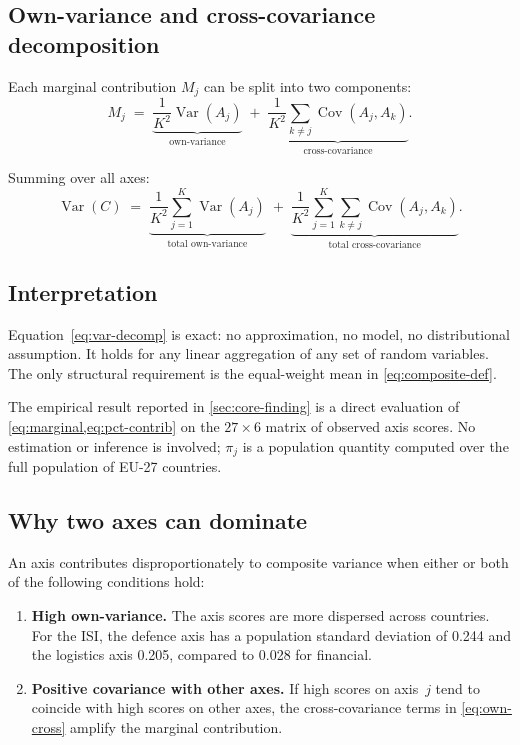 \subsection{Own-variance and cross-covariance decomposition}

Each marginal contribution $M_j$ can be split into two components:
\begin{equation}\label{eq:own-cross}
  M_j
  \;=\;
  \underbrace{\frac{1}{K^2}\operatorname{Var}(A_j)}_{\text{own-variance}}
  \;+\;
  \underbrace{\frac{1}{K^2}\sum_{k \neq j}
    \operatorname{Cov}(A_j, A_k)}_{\text{cross-covariance}}.
\end{equation}

Summing over all axes:
\begin{equation}\label{eq:own-cross-total}
  \operatorname{Var}(C)
  \;=\;
  \underbrace{\frac{1}{K^2}\sum_{j=1}^{K}
    \operatorname{Var}(A_j)}_{\text{total own-variance}}
  \;+\;
  \underbrace{\frac{1}{K^2}\sum_{j=1}^{K}\sum_{k \neq j}
    \operatorname{Cov}(A_j, A_k)}_{\text{total cross-covariance}}.
\end{equation}

\subsection{Interpretation}

Equation~\eqref{eq:var-decomp} is exact: no approximation, no
model, no distributional assumption.  It holds for any linear
aggregation of any set of random variables.  The only structural
requirement is the equal-weight mean in \cref{eq:composite-def}.

The empirical result reported in \cref{sec:core-finding} is a direct
evaluation of \cref{eq:marginal,eq:pct-contrib} on the
$27 \times 6$ matrix of observed axis scores.  No estimation or
inference is involved; $\pi_j$ is a population quantity computed over
the full population of EU-27 countries.

\subsection{Why two axes can dominate}

An axis contributes disproportionately to composite variance when
either or both of the following conditions hold:

\begin{enumerate}[leftmargin=2em]
  \item \textbf{High own-variance.}  The axis scores are more
    dispersed across countries.  For the ISI, the defence axis has
    a population standard deviation of 0.244 and the logistics axis
    0.205, compared to 0.028 for financial.

  \item \textbf{Positive covariance with other axes.}  If high scores
    on axis~$j$ tend to coincide with high scores on other axes, the
    cross-covariance terms in \cref{eq:own-cross} amplify the
    marginal contribution.
\end{enumerate}

